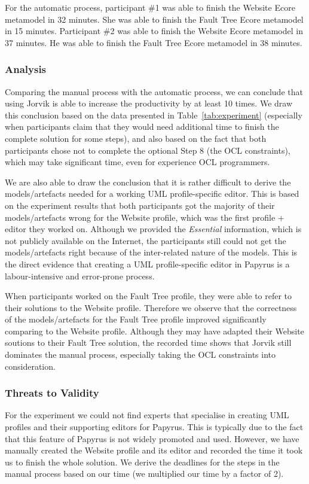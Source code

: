 For the automatic process, participant \#1 was able to finish the Website Ecore metamodel in 32 minutes.
She was able to finish the Fault Tree Ecore metamodel in 15 minutes.
Participant \#2 was able to finish the Website Ecore metamodel in 37 minutes.
He was able to finish the Fault Tree Ecore metamodel in 38 minutes.

\subsubsection{Analysis}
Comparing the manual process with the automatic process, we can conclude that using Jorvik is able to increase the productivity by at least 10 times. 
We draw this conclusion based on the data presented in Table~\ref{tab:experiment} (especially when participants claim that they would need additional time to finish the complete solution for some steps), and also based on the fact that both participants chose not to complete the optional Step 8 (the OCL constraints), which may take significant time, even for experience OCL programmers.

We are also able to draw the conclusion that it is rather difficult to derive the models/artefacts needed for a working UML profile-specific editor. 
This is based on the experiment results that both participants got the majority of their models/artefacts wrong for the Website profile, which was the first profile + editor they worked on.
Although we provided the \textit{Essential} information, which is not publicly available on the Internet, the participants still could not get the models/artefacts right because of the inter-related nature of the models.
This is the direct evidence that creating a UML profile-specific editor in Papyrus is a labour-intensive and error-prone process.

When participants worked on the Fault Tree profile, they were able to refer to their solutions to the Website profile. 
Therefore we observe that the correctness of the models/artefacts for the Fault Tree profile improved significantly comparing to the Website profile. 
Although they may have adapted their Website soutions to their Fault Tree solution, the recorded time shows that Jorvik still dominates the manual process, especially taking the OCL constraints into consideration.

\subsubsection{Threats to Validity}
For the experiment we could not find experts that specialise in creating UML profiles and their supporting editors for Papyrus. 
This is typically due to the fact that this feature of Papyrus is not widely promoted and used.
However, we have manually created the Website profile and its editor and recorded the time it took us to finish the whole solution. 
We derive the deadlines for the steps in the manual process based on our time (we multiplied our time by a factor of 2). 
